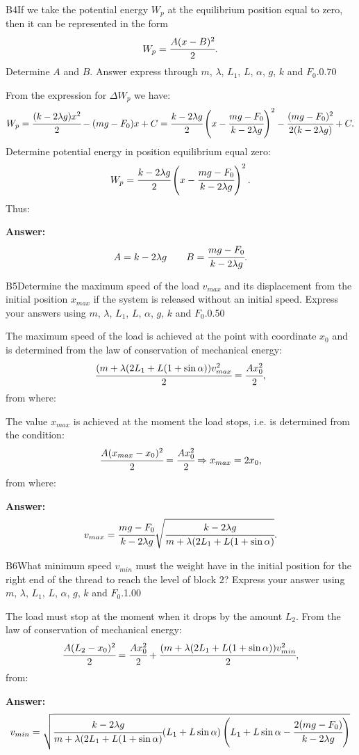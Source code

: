 \documentclass[11pt,a4paper]{article}
\begin{document}
\begin{solcard}{B4}{If we take the potential energy $W_p$ at the equilibrium position equal to zero, then it can be represented in the form $$W_p=\cfrac{A(x-B)^2}{2}. $$Determine $A$ and $B$. Answer express through $m$, $\lambda$, $L_1$, $L$, $\alpha$, $g$, $k$ and $F_0$.}{0.70}

From the expression for $\Delta{W}_p$ we have: $$W_p=\cfrac{(k-2\lambda g)x^2}{2}-(mg-F_0)x+C=\cfrac{k-2\lambda g}{2}\left(x-\cfrac{mg-F_0}{k-2\lambda g}\right)^2-\cfrac{(mg-F_0)^2}{2(k-2\lambda g)}+C{.} $$Determine potential energy in position equilibrium equal zero: $$W_p=\cfrac{k-2\lambda g}{2}\left(x-\cfrac{mg-F_0}{k-2\lambda g}\right)^2{.} $$Thus:

\par\smallskip\noindent\textbf{Answer:} $$A=k-2\lambda g\qquad B=\cfrac{mg-F_0}{k-2\lambda g}{.} $$
\end{solcard}

\begin{solcard}{B5}{Determine the maximum speed of the load $v_{max}$ and its displacement from the initial position $x_{max}$ if the system is released without an initial speed.  Express your answers using $m$, $\lambda$, $L_1$, $L$, $\alpha$, $g$, $k$ and $F_0$.}{0.50}

The maximum speed of the load is achieved at the point with coordinate $x_0$ and is determined from the law of conservation of mechanical energy: $$\cfrac{(m+\lambda(2L_1+L(1+\sin\alpha))v^2_{max}}{2}=\cfrac{Ax^2_0}{2}{,} $$from where:


The value $x_{max}$ is achieved at the moment the load stops, i.e. is determined from the condition: $$\cfrac{A(x_{max}-x_0)^2}{2}=\cfrac{Ax^2_0}{2}\Rightarrow x_{max}=2x_0{,} $$from where:

\par\smallskip\noindent\textbf{Answer:} $$v_{max}=\cfrac{mg-F_0}{k-2\lambda g}\sqrt{\cfrac{k-2\lambda g}{m+\lambda(2L_1+L(1+\sin\alpha)}}{.} $$
\end{solcard}

\begin{solcard}{B6}{What minimum speed $v_{min}$ must the weight have in the initial position for the right end of the thread to reach the level of block $2$? Express your answer using $m$, $\lambda$, $L_1$, $L$, $\alpha$, $g$, $k$ and $F_0$.}{1.00}

The load must stop at the moment when it drops by the amount $L_2$. From the law of conservation of mechanical energy: $$\cfrac{A(L_2-x_0)^2}{2}=\cfrac{Ax^2_0}{2}+\cfrac{(m+\lambda(2L_1+L(1+\sin\alpha))v^2_{min}}{2}{,} $$from:

\par\smallskip\noindent\textbf{Answer:} $$v_{min}=\sqrt{\cfrac{k-2\lambda g}{m+\lambda(2L_1+L(1+\sin\alpha)}(L_1+L\sin\alpha)\left(L_1+L\sin\alpha-\cfrac{2(mg-F_0)}{k-2\lambda g}\right)} $$
\end{solcard}
\end{document}
